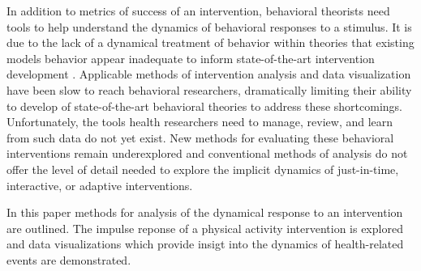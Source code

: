 In addition to metrics of success of an intervention, behavioral theorists need tools to help understand the dynamics of behavioral responses to a stimulus.
It is due to the lack of a dynamical treatment of behavior within theories that existing models behavior appear inadequate to inform state-of-the-art intervention development \cite{riley2011}.
Applicable methods of intervention analysis and data visualization have been slow to reach behavioral researchers, dramatically limiting their ability to develop of state-of-the-art behavioral theories to address these shortcomings.
Unfortunately, the tools health researchers need to manage, review, and learn from such data do not yet exist.
New methods for evaluating these behavioral interventions remain underexplored and conventional methods of analysis do not offer the level of detail needed to explore the implicit dynamics of just-in-time, interactive, or adaptive interventions.


In this paper methods for analysis of the dynamical response to an intervention are outlined. The impulse reponse of a physical activity intervention is explored and data visualizations which provide insigt into the dynamics of health-related events are demonstrated.

